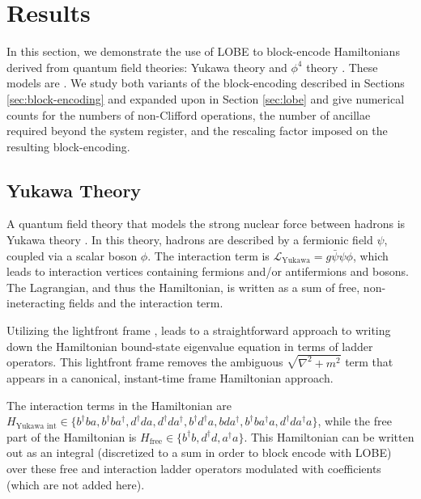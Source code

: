 \section{Results}
\label{sec:results}

In this section, we demonstrate the use of LOBE to block-encode Hamiltonians derived from quantum field theories: Yukawa theory and $\phi^4$ theory . These models are .
We study both variants of the block-encoding described in Sections \ref{sec:block-encoding} and expanded upon in Section \ref{sec:lobe} and give numerical counts for the numbers of non-Clifford operations, the number of ancillae required beyond the system register, and the rescaling factor imposed on the resulting block-encoding.

\subsection{Yukawa Theory}
A quantum field theory that models the strong nuclear force between hadrons is Yukawa theory \cite{Peskin:1995ev}. In this theory, hadrons are described by a fermionic field $\psi$, coupled via a scalar boson $\phi$. The interaction term is $\mathcal{L}_{\text{Yukawa}} = g\bar\psi \psi \phi$, which leads to interaction vertices containing fermions and/or antifermions and bosons. The Lagrangian, and thus the Hamiltonian, is written as a sum of free, non-ineteracting fields and the interaction term.

Utilizing the lightfront frame \cite{Dirac1949}, leads to a straightforward approach to writing down the Hamiltonian bound-state eigenvalue equation in terms of ladder operators. This lightfront frame removes the ambiguous $\sqrt{\nabla^2 + m^2}$ term that appears in a canonical, instant-time frame Hamiltonian approach. 

The interaction terms in the Hamiltonian are $H_{\text{Yukawa int}} \in \{b^\dagger b a, b^\dagger b a^\dagger, d^\dagger d a, d^\dagger d a^\dagger, b^\dagger d^\dagger a, bda^\dagger, b^\dagger b a^\dagger a, d^\dagger d a^\dagger a \}$, while the free part of the Hamiltonian is $H_{\text{free}} \in \{b^\dagger b, d^\dagger d, a^\dagger a \}$.
This Hamiltonian can be written out as an integral (discretized to a sum in order to block encode with LOBE) over these free and interaction ladder operators modulated with coefficients (which are not added here). 


